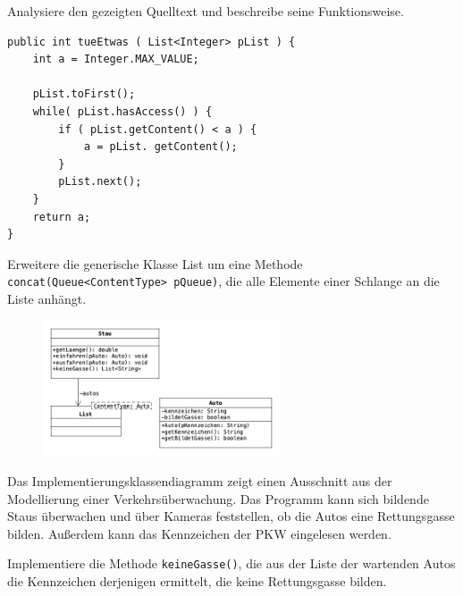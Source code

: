 \documentclass[10pt, a4paper, ngerman]{arbeitsblatt}
\begin{document}
\ReiheTitel

\begin{aufgabe}
Analysiere den gezeigten Quelltext und beschreibe seine Funktionsweise.

\begin{verbatim}
public int tueEtwas ( List<Integer> pList ) {
	int a = Integer.MAX_VALUE;

	pList.toFirst();
	while( pList.hasAccess() ) {
		if ( pList.getContent() < a ) {
			a = pList. getContent();
		}
		pList.next();
	}
	return a;
}
\end{verbatim}
\end{aufgabe}


\begin{aufgabe}
Erweitere die generische Klasse List um eine Methode \texttt{concat(Queue<ContentType> pQueue)}, die alle Elemente einer Schlange an die Liste anhängt.
\end{aufgabe}

\begin{aufgabe}
	\begin{wrapfix}
	\begin{figure}
		\includegraphics[width=7cm]{Q1-AB.II.09-CD_Stau.png}
	\end{figure}

Das Implementierungsklassendiagramm zeigt einen Ausschnitt aus der Modellierung einer Verkehrsüberwachung. Das Programm kann sich bildende Staus überwachen und über Kameras feststellen, ob die Autos eine Rettungsgasse bilden. Außerdem kann das Kennzeichen der PKW eingelesen werden.

Implementiere die Methode \texttt{keineGasse()}, die aus der Liste der wartenden Autos die Kennzeichen derjenigen ermittelt, die keine Rettungsgasse bilden.
\end{wrapfix}
\end{aufgabe}
\end{document}
